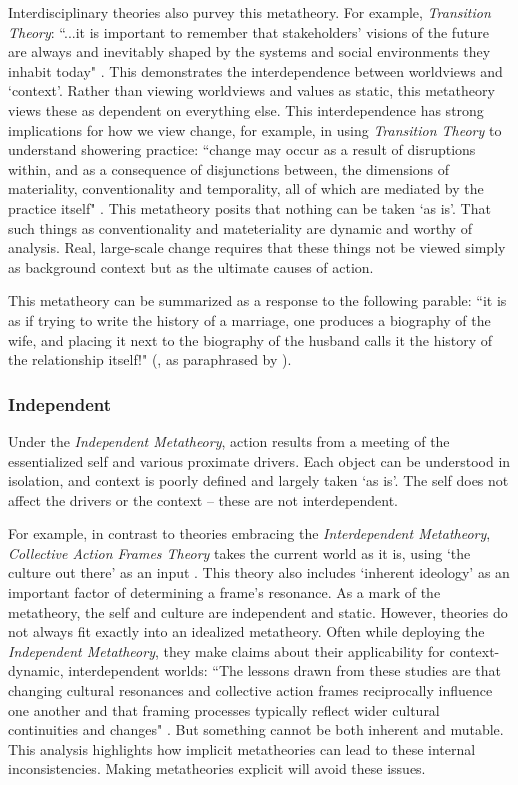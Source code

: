 \documentclass[12 pt]{article}
\begin{document}
		Interdisciplinary theories also purvey this metatheory. For example, \textit{Transition Theory}: ``...it is important to remember that stakeholders' visions of the future are always and	inevitably shaped by the systems and social environments they inhabit today" \parencite[][p. 765]{Shove2007}. This demonstrates the interdependence between worldviews and `context'. Rather than viewing worldviews and values as static, this metatheory views these as dependent on everything else. This interdependence has strong implications for how we view change, for example, in using \textit{Transition Theory} to understand showering practice: ``change may occur as a result of disruptions within, and as a consequence of disjunctions between, the dimensions of materiality, conventionality and temporality, all of which are mediated by the practice itself" \parencite[][unpaginated]{Hand2005}. This metatheory posits that nothing can be taken  `as is'. That such things as conventionality and mateteriality are dynamic and worthy of analysis. Real, large-scale change requires that these things not be viewed simply as background context but as the ultimate causes of action. 
		
		This metatheory can be summarized as a response to the following parable:  ``it is as if trying to write the history of a marriage,
		one produces a biography of the wife, and placing it next to the biography
		of the husband calls it the history of the relationship itself!" (\textcite{White1995}, as paraphrased by \textcite[][p. 204]{Agrawal2005}). 
		
	
	\subsubsection{Independent}
	Under the \textit{Independent Metatheory}, action results from a meeting of the essentialized self and various proximate drivers. Each object can be understood in isolation, and context is poorly defined and  largely taken `as is'. The self does not affect the drivers or the context -- these are not interdependent. 

	
	For example, in contrast to theories embracing the \textit{Interdependent Metatheory}, \textit{Collective Action Frames Theory} takes the current world as it is, using `the culture out there' as an input \parencite{Benford2000}. This theory also includes `inherent ideology' as an important factor of determining a frame's resonance. As a mark of the metatheory, the self and culture are independent and static. However, theories do not always fit exactly into an idealized metatheory. Often while deploying the \textit{Independent Metatheory}, they make claims about their applicability for context-dynamic, interdependent worlds:  ``The lessons drawn from these studies are that changing cultural resonances and collective action frames reciprocally influence one another and that framing processes typically reflect wider cultural continuities and changes" \parencite[][p. 629]{Benford2000}. But something cannot be both inherent and mutable. This analysis highlights how implicit metatheories can lead to these internal inconsistencies. Making metatheories explicit will avoid these issues. 
	
\end{document}
